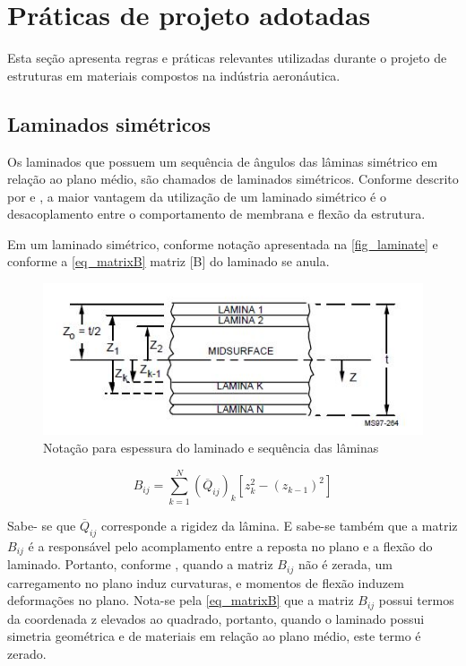 \section{Práticas de projeto adotadas}
Esta seção apresenta regras e práticas relevantes utilizadas durante o projeto de estruturas em materiais compostos na indústria aeronáutica.

\subsection{Laminados simétricos}
Os laminados que possuem um sequência	de ângulos das lâminas simétrico em relação ao plano médio, são chamados de laminados simétricos. Conforme descrito por \cite{mil2002handbook} e \cite{niucomposite}, a maior vantagem da utilização de um laminado simétrico é o desacoplamento entre o comportamento de membrana e flexão da estrutura.

Em um laminado simétrico, conforme notação apresentada na \autoref{fig_laminate} e conforme a \autoref{eq_matrixB} matriz [B] do laminado se anula.

\begin{figure}[h]
	\caption{\label{fig_laminate}Notação para espessura do laminado e sequência das lâminas}
  \centering
  \includegraphics[scale=1.0]{figura/Laminate}
\end{figure}

\begin{equation} \label{eq_matrixB}
B_{ij}
=
\sum_{k=1}^N (\overline{Q}_{ij})_k [z_k^2 - (z_{k-1})^2]
\end{equation}

Sabe- se que $ \overline{Q}_{ij} $ corresponde a rigidez da lâmina. E sabe-se também que a matriz $ B_{ij} $ é a responsável pelo acomplamento entre a reposta no plano e a flexão do laminado. Portanto, conforme \cite{nasa1997guidelines}, quando a matriz $ B_{ij} $ não é zerada, um carregamento no plano induz curvaturas, e momentos de flexão induzem deformações no plano. Nota-se pela \autoref{eq_matrixB} que a matriz $ B_{ij} $ possui termos da coordenada z elevados ao quadrado, portanto, quando o laminado possui simetria geométrica e de materiais em relação ao plano médio, este termo é zerado.

